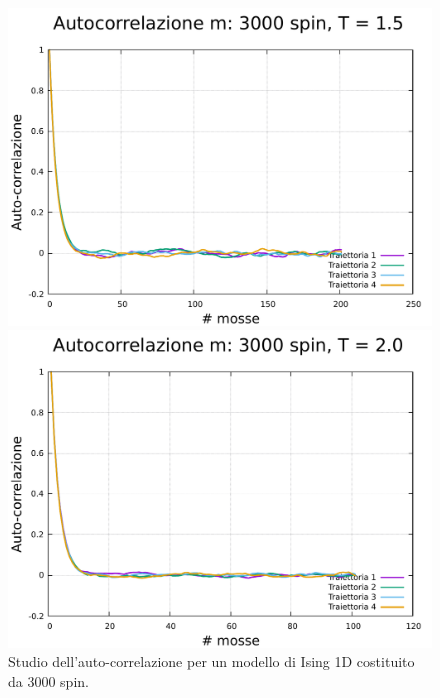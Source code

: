 \begin{figure}[htbp]
    \begin{minipage}{0.45\textwidth}  
      \centering
      \includegraphics[page=1, width=\textwidth]{Immagini/simIsing1D/magn0.02/tcorr/tcorr_3000_1.5.pdf}
      \caption{$T\,=\,1.5$}
    \end{minipage}\hfill
    \begin{minipage}{0.45\textwidth}  
      \centering
      \includegraphics[page=1, width=\textwidth]{Immagini/simIsing1D/magn0.02/tcorr/tcorr_3000_2.0.pdf}
      \caption{$T\,=\,2.0$}
    \end{minipage}
    \caption{Studio dell'auto-correlazione per un modello di Ising 1D costituito da 3000 spin.}
\end{figure}

